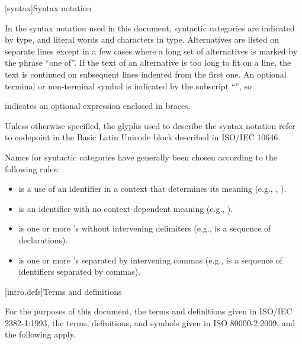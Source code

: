\documentclass{wg21}
\begin{document}
[syntax]{Syntax notation}

\pnum
{}%
In the syntax notation used in this document, syntactic
categories are indicated by  type, and literal words
and characters in   type. Alternatives are
listed on separate lines except in a few cases where a long set of
alternatives is marked by the phrase ``one of''. If the text of an alternative is too long to fit on a line, the text is continued on subsequent lines indented from the first one.
An optional terminal or non-terminal symbol is indicated by the subscript
``\opt{\relax}'', so
\begin{ncbnf}
    \terminal{\{}  \terminal{\}}
\end{ncbnf}
indicates an optional expression enclosed in braces.%

\begin{addedblock}
Unless otherwise specified, the glyphs used to describe the syntax notation refer to codepoint in the Basic Latin Unicode block described in ISO/IEC 10646. 
\end{addedblock}

\pnum
Names for syntactic categories have generally been chosen according to
the following rules:
\begin{itemize}
    \item {} is a use of an identifier in a context that
    determines its meaning (e.g., ,
    ).
    \item {} is an identifier with no context-dependent meaning
    (e.g., ).
    \item {} is one or more 's without intervening
    delimiters (e.g.,  is a sequence of
    declarations).
    \item {} is one or more 's separated by
    intervening commas (e.g.,  is a sequence of
    identifiers separated by commas).
\end{itemize}%


[intro.defs]{Terms and definitions}

\pnum
{}%
For the purposes of this document,
the terms and definitions
given in ISO/IEC 2382-1:1993,
the terms, definitions, and symbols
given in ISO 80000-2:2009,
and the following apply.
\end{document}
